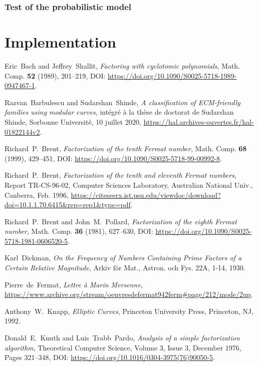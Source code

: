 \documentclass[a4paper, 11pt, pdftex]{report}
\theoremstyle{plain}
\theoremstyle{definition}
\begin{document}
\subsection{Test of the probabilistic model}



\chapter{Implementation}

\begin{thebibliography}{99}

 Eric~Bach and Jeffrey~Shallit, \emph{Factoring with cyclotomic polynomials},
Math. Comp. \textbf{52} (1989), 201--219, DOI: \url{https://doi.org/10.1090/S0025-5718-1989-0947467-1}.

 Razvan~Barbulescu and Sudarshan~Shinde, \emph{A classification
of ECM-friendly families using modular curves}, intégré à la thèse de doctorat de Sudarshan Shinde,
Sorbonne Université, 10 juillet 2020, \url{https://hal.archives-ouvertes.fr/hal-01822144v2}.

 Richard~P.~Brent, \emph{Factorization of the tenth Fermat number}, Math. Comp.
\textbf{68} (1999), 429--451, DOI: \url{https://doi.org/10.1090/S0025-5718-99-00992-8}.

 Richard~P.~Brent, \emph{Factorization of the tenth and eleventh Fermat numbers},
Report TR-CS-96-02, Computer Sciences Laboratory, Australian National Univ., Canberra, Feb. 1996,
\url{https://citeseerx.ist.psu.edu/viewdoc/download?doi=10.1.1.70.6415&rep=rep1&type=pdf}.

 Richard~P.~Brent and John~M.~Pollard, \emph{Factorization of the eighth
Fermat number}, Math. Comp. \textbf{36} (1981), 627--630, DOI:
\url{https://doi.org/10.1090/S0025-5718-1981-0606520-5}.

 Karl~Dickman, \emph{On the Frequency of Numbers Containing Prime Factors
of a Certain Relative Magnitude}, Arkiv för Mat., Astron. och Fys. 22A, 1-14, 1930. 

 Pierre~de~Fermat, \emph{Lettre à Marin Mersenne},
\url{https://www.archive.org/stream/oeuvresdefermat942ferm#page/212/mode/2up}.

 Anthony~W.~Knapp, \emph{Elliptic Curves}, Princeton University Press,
Princeton, NJ, 1992.

 Donald~E.~Knuth and Luis~Trabb~Pardo, \emph{Analysis of a simple
factorization algorithm}, Theoretical Computer Science, Volume 3, Issue 3, December 1976,
Pages 321--348, DOI: \url{https://doi.org/10.1016/0304-3975(76)90050-5}.


\end{thebibliography}
\end{document}
